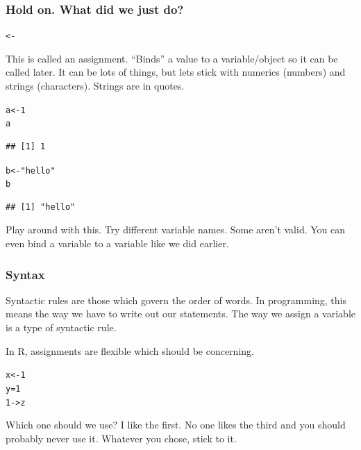 \documentclass{beamer}\usepackage{graphicx, color}
\makeatletter
\newcommand{\hlstring}[1]{\textcolor[rgb]{0.6,0.6,1}{#1}}%
\newenvironment{kframe}{%
 \def\at@end@of@kframe{}%
 \ifinner\ifhmode%
  \def\at@end@of@kframe{\end{minipage}}%
  \begin{minipage}{\columnwidth}%
 \fi\fi%
 \def\FrameCommand##1{\hskip\@totalleftmargin \hskip-\fboxsep
 \colorbox{shadecolor}{##1}\hskip-\fboxsep
     \hskip-\linewidth \hskip-\@totalleftmargin \hskip\columnwidth}%
 \MakeFramed {\advance\hsize-\width
   \@totalleftmargin\z@ \linewidth\hsize
   \@setminipage}}%
 {\par\unskip\endMakeFramed%
 \at@end@of@kframe}
\newenvironment{knitrout}{}{} %
\makeatother
\begin{document}
\begin{frame}[fragile]
  \frametitle{Hold on. What did we just do?}
\begin{knitrout}\small
{}\color{fgcolor}\begin{kframe}
\begin{alltt}
<-
\end{alltt}
\end{kframe}
\end{knitrout}

  This is called an assignment. ``Binds'' a value to a variable/object so it can be called later. It can be lots of things, but lets stick with numerics (numbers) and strings (characters). Strings are in quotes.

\begin{knitrout}\small
{}\color{fgcolor}\begin{kframe}
\begin{alltt}
a <- 1
a
\end{alltt}
\begin{verbatim}
## [1] 1
\end{verbatim}
\begin{alltt}

b <- \hlstring{"hello"}
b
\end{alltt}
\begin{verbatim}
## [1] "hello"
\end{verbatim}
\end{kframe}
\end{knitrout}


  Play around with this. Try different variable names. Some aren't valid. You can even bind a variable to a variable like we did earlier.

\end{frame}

\begin{frame}[fragile]
  \frametitle{Syntax}

  Syntactic rules are those which govern the order of words. In programming, this means the way we have to write out our statements. The way we assign a variable is a type of syntactic rule.

  In R, assignments are flexible which should be concerning.

\begin{knitrout}\small
{}\color{fgcolor}\begin{kframe}
\begin{alltt}
x <- 1
y = 1
1 -> z
\end{alltt}
\end{kframe}
\end{knitrout}


  Which one should we use? I like the first. No one likes the third and you should probably never use it. Whatever you chose, stick to it.

\end{frame}
\end{document}
